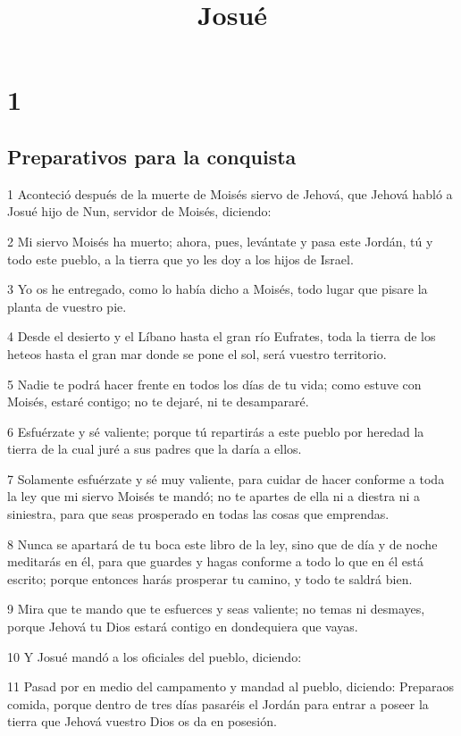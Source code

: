 

\title{Josué}

\chapter{1}

\section*{Preparativos para la conquista}

\par 1 Aconteció después de la muerte de Moisés siervo de Jehová, que Jehová habló a Josué hijo de Nun, servidor de Moisés, diciendo:
\par 2 Mi siervo Moisés ha muerto; ahora, pues, levántate y pasa este Jordán, tú y todo este pueblo, a la tierra que yo les doy a los hijos de Israel.
\par 3 Yo os he entregado, como lo había dicho a Moisés, todo lugar que pisare la planta de vuestro pie.
\par 4 Desde el desierto y el Líbano hasta el gran río Eufrates, toda la tierra de los heteos hasta el gran mar donde se pone el sol, será vuestro territorio.
\par 5 Nadie te podrá hacer frente en todos los días de tu vida; como estuve con Moisés, estaré contigo; no te dejaré, ni te desampararé.
\par 6 Esfuérzate y sé valiente; porque tú repartirás a este pueblo por heredad la tierra de la cual juré a sus padres que la daría a ellos.
\par 7 Solamente esfuérzate y sé muy valiente, para cuidar de hacer conforme a toda la ley que mi siervo Moisés te mandó; no te apartes de ella ni a diestra ni a siniestra, para que seas prosperado en todas las cosas que emprendas.
\par 8 Nunca se apartará de tu boca este libro de la ley, sino que de día y de noche meditarás en él, para que guardes y hagas conforme a todo lo que en él está escrito; porque entonces harás prosperar tu camino, y todo te saldrá bien.
\par 9 Mira que te mando que te esfuerces y seas valiente; no temas ni desmayes, porque Jehová tu Dios estará contigo en dondequiera que vayas.
\par 10 Y Josué mandó a los oficiales del pueblo, diciendo:
\par 11 Pasad por en medio del campamento y mandad al pueblo, diciendo: Preparaos comida, porque dentro de tres días pasaréis el Jordán para entrar a poseer la tierra que Jehová vuestro Dios os da en posesión.
